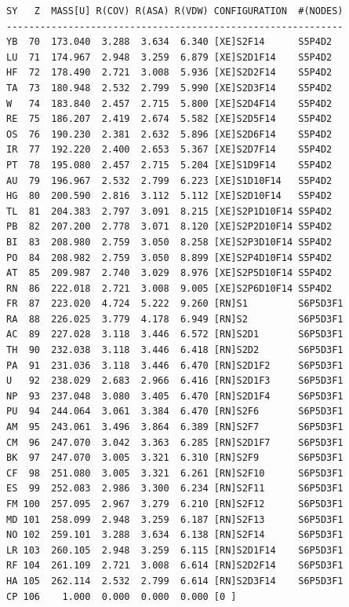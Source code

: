 \documentclass[final,12pt]{article}
\begin{document}
\begin{verbatim}
SY   Z  MASS[U] R(COV) R(ASA) R(VDW) CONFIGURATION  #(NODES)
------------------------------------------------------------
YB  70  173.040  3.288  3.634  6.340 [XE]S2F14      S5P4D2    
LU  71  174.967  2.948  3.259  6.879 [XE]S2D1F14    S5P4D2    
HF  72  178.490  2.721  3.008  5.936 [XE]S2D2F14    S5P4D2    
TA  73  180.948  2.532  2.799  5.990 [XE]S2D3F14    S5P4D2    
W   74  183.840  2.457  2.715  5.800 [XE]S2D4F14    S5P4D2    
RE  75  186.207  2.419  2.674  5.582 [XE]S2D5F14    S5P4D2    
OS  76  190.230  2.381  2.632  5.896 [XE]S2D6F14    S5P4D2    
IR  77  192.220  2.400  2.653  5.367 [XE]S2D7F14    S5P4D2    
PT  78  195.080  2.457  2.715  5.204 [XE]S1D9F14    S5P4D2    
AU  79  196.967  2.532  2.799  6.223 [XE]S1D10F14   S5P4D2    
HG  80  200.590  2.816  3.112  5.112 [XE]S2D10F14   S5P4D2    
TL  81  204.383  2.797  3.091  8.215 [XE]S2P1D10F14 S5P4D2    
PB  82  207.200  2.778  3.071  8.120 [XE]S2P2D10F14 S5P4D2    
BI  83  208.980  2.759  3.050  8.258 [XE]S2P3D10F14 S5P4D2    
PO  84  208.982  2.759  3.050  8.899 [XE]S2P4D10F14 S5P4D2    
AT  85  209.987  2.740  3.029  8.976 [XE]S2P5D10F14 S5P4D2    
RN  86  222.018  2.721  3.008  9.005 [XE]S2P6D10F14 S5P4D2    
FR  87  223.020  4.724  5.222  9.260 [RN]S1         S6P5D3F1  
RA  88  226.025  3.779  4.178  6.949 [RN]S2         S6P5D3F1  
AC  89  227.028  3.118  3.446  6.572 [RN]S2D1       S6P5D3F1  
TH  90  232.038  3.118  3.446  6.418 [RN]S2D2       S6P5D3F1  
PA  91  231.036  3.118  3.446  6.470 [RN]S2D1F2     S6P5D3F1  
U   92  238.029  2.683  2.966  6.416 [RN]S2D1F3     S6P5D3F1  
NP  93  237.048  3.080  3.405  6.470 [RN]S2D1F4     S6P5D3F1  
PU  94  244.064  3.061  3.384  6.470 [RN]S2F6       S6P5D3F1  
AM  95  243.061  3.496  3.864  6.389 [RN]S2F7       S6P5D3F1  
CM  96  247.070  3.042  3.363  6.285 [RN]S2D1F7     S6P5D3F1  
BK  97  247.070  3.005  3.321  6.310 [RN]S2F9       S6P5D3F1  
CF  98  251.080  3.005  3.321  6.261 [RN]S2F10      S6P5D3F1  
ES  99  252.083  2.986  3.300  6.234 [RN]S2F11      S6P5D3F1  
FM 100  257.095  2.967  3.279  6.210 [RN]S2F12      S6P5D3F1  
MD 101  258.099  2.948  3.259  6.187 [RN]S2F13      S6P5D3F1  
NO 102  259.101  3.288  3.634  6.138 [RN]S2F14      S6P5D3F1  
LR 103  260.105  2.948  3.259  6.115 [RN]S2D1F14    S6P5D3F1  
RF 104  261.109  2.721  3.008  6.614 [RN]S2D2F14    S6P5D3F1  
HA 105  262.114  2.532  2.799  6.614 [RN]S2D3F14    S6P5D3F1  
CP 106    1.000  0.000  0.000  0.000 [0 ]                     
\end{verbatim}
\normalsize
\newpage
\end{document}
